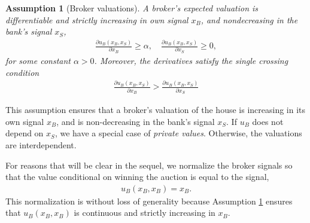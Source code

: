 \documentclass[11pt,twopage]{article}
\newtheorem{assumption}{Assumption}
{\bf}{\it}
\begin{document}
\begin{assumption}[Broker valuations]\label{as:valuations}
  A broker's expected valuation is differentiable and strictly
  increasing in own signal $x_B$, and nondecreasing in the bank's
  signal $x_S$,
  \begin{align}
    \frac{\partial u_B(x_B,x_S)}{\partial x_B}\geq \alpha,\quad
    \frac{\partial u_B(x_B,x_S)}{\partial x_S} \geq 0, \nonumber
  \end{align}
  for some constant $\alpha>0$.  Moreover, the derivatives satisfy the
  \emph{single crossing} condition
  \begin{align}
    \frac{\partial u_B(x_B,x_S)}{\partial x_B}>\frac{\partial
      u_B(x_B,x_S)}{\partial x_S} \nonumber
  \end{align}

  \label{as:utilities}
\end{assumption}




This assumption ensures that a broker's valuation of the house is
increasing in its own signal $x_B$, and is non-decreasing in the
bank's signal $x_S$. If $u_B$ does not depend on $x_S$, we have a
special case of \emph{private values}. Otherwise, the valuations are
interdependent.



For reasons that will be clear in the sequel, we normalize the broker
signals so that the value conditional on winning the auction is equal
to the signal,
\begin{align}
  u_B(x_B,x_B) = x_B.
  \label{bnorm}
\end{align}
This normalization is without loss of generality because Assumption
\ref{as:valuations} ensures that $u_B(x_B,x_B)$ is continuous and
strictly increasing in $x_B$.
\end{document}
